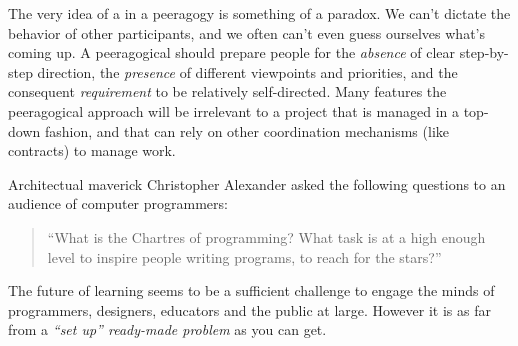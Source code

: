 The very idea of a  in a peeragogy is something
of a paradox.  We can't dictate the behavior of other participants,
and we often can't even guess ourselves what's coming up.  A
peeragogical  should prepare people for the
\emph{absence} of clear step-by-step direction, the \emph{presence} of
different viewpoints and priorities, and the consequent
\emph{requirement} to be relatively self-directed.  Many features the
peeragogical approach will be irrelevant to a project that is managed
in a top-down fashion, and that can rely on other coordination
mechanisms (like contracts) to manage work.

Architectual maverick Christopher Alexander asked the following
questions to an audience of computer programmers:
\begin{quote}
``What is the Chartres of programming? What task is at a high enough level to inspire people writing programs, to reach for the stars?'' \cite{alexander1999origins}
\end{quote}

The future of learning seems to be a sufficient challenge to engage
the minds of programmers, designers, educators and the public at
large.  However it is as far from a \emph{``set up'' ready-made problem}
\cite[p.~15]{deleuze1991bergsonism} as you can get.


